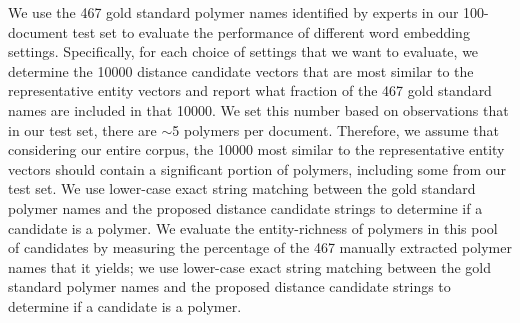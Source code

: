 We use the 467 gold standard polymer names identified by experts in our 100-document test set to
evaluate the performance of different word embedding settings.
Specifically, for each choice of settings that we want to evaluate,
we determine the \num{10000} distance candidate vectors that are most similar to the representative entity vectors 
and report what fraction of the 467 gold standard names are included in that \num{10000}.
We set this number based on observations that in our test set, there are $\sim$5 polymers per document.
Therefore, we assume that considering our entire corpus,  the \num{10000} most similar to the representative entity vectors should contain a significant portion of polymers, including some from our test set.
We use lower-case exact string matching between the gold standard polymer names and the proposed distance candidate strings to determine if a candidate is a polymer.
We evaluate the entity-richness of polymers in this pool of candidates by measuring the percentage of the 467 manually extracted polymer names that it yields;
we use lower-case exact string matching between the gold standard polymer names and the proposed distance candidate strings to determine if a candidate is a polymer.

